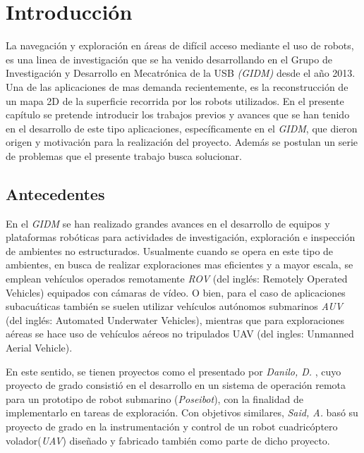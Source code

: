 \chapter{Introducción}
\label{capitulo1}

La navegación y exploración en áreas de difícil acceso mediante el uso de robots, es una linea de investigación que se ha venido desarrollando en el Grupo de Investigación y Desarrollo en Mecatrónica de la USB  \textit{(GIDM)} desde el año 2013. Una de las aplicaciones de mas demanda recientemente, es la reconstrucción de un mapa 2D de la superficie recorrida por los robots utilizados. En el presente capítulo se pretende introducir los trabajos previos y avances que se han tenido en el desarrollo de este tipo aplicaciones, específicamente en el \textit{GIDM}, que dieron origen y motivación para la realización del proyecto. Además se postulan un serie de problemas que el presente trabajo busca solucionar.

\section{Antecedentes}

En el \textit{GIDM} se han realizado grandes avances en el desarrollo de equipos y plataformas robóticas para actividades de investigación, exploración e inspección de ambientes no estructurados. Usualmente cuando se opera en este tipo de ambientes, en busca de realizar exploraciones mas eficientes y a mayor escala, se emplean vehículos operados remotamente \textit{ROV} (del inglés: Remotely Operated Vehicles) equipados con cámaras de vídeo. O bien, para el caso de aplicaciones subacuáticas también se suelen utilizar vehículos autónomos submarinos \textit{AUV} (del inglés: Automated Underwater Vehicles), mientras que para exploraciones aéreas se hace uso de vehículos aéreos no tripulados UAV (del ingles: Unmanned Aerial Vehicle).

En este sentido, se tienen proyectos como el presentado por \textit{Danilo, D.} \cite{danilo}, cuyo proyecto de grado consistió en el desarrollo en un sistema de operación remota para un prototipo de robot submarino (\textit{Poseibot}), con la finalidad de implementarlo en tareas de exploración. Con objetivos similares, \textit{Said, A.} \cite{said} basó su proyecto de grado en la instrumentación y control de un robot cuadricóptero volador(\textit{UAV}) diseñado y fabricado también como parte de dicho proyecto. 

